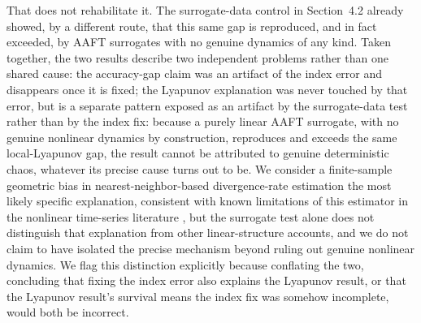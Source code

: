 \documentclass[preprint,12pt]{elsarticle}
\begin{document}
That does not rehabilitate it. The surrogate-data control in Section~4.2 already showed, by a
different route, that this same gap is reproduced, and in fact exceeded, by AAFT surrogates
with no genuine dynamics of any kind. Taken together, the two results describe two independent
problems rather than one shared cause: the accuracy-gap claim was an artifact of the index
error and disappears once it is fixed; the Lyapunov explanation was never touched by that
error, but is a separate pattern exposed as an artifact by the surrogate-data test rather than by
the index fix: because a purely linear AAFT surrogate, with no genuine nonlinear dynamics by
construction, reproduces and exceeds the same local-Lyapunov gap, the result cannot be attributed
to genuine deterministic chaos, whatever its precise cause turns out to be. We consider a
finite-sample geometric bias in nearest-neighbor-based divergence-rate estimation the most likely
specific explanation, consistent with known limitations of this estimator in the nonlinear
time-series literature \citep{theiler1992,kantz2004}, but the surrogate test alone does not
distinguish that explanation from other linear-structure accounts, and we do not claim to have
isolated the precise mechanism beyond ruling out genuine nonlinear dynamics. We flag this
distinction explicitly because conflating the two, concluding that fixing
the index error also explains the Lyapunov result, or that the Lyapunov result's survival
means the index fix was somehow incomplete, would both be incorrect.
\end{document}
